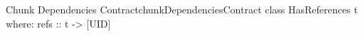 \begin{pseudohaskell}{Chunk Dependencies Contract}{chunkDependenciesContract}
class HasReferences t where:
      refs :: t -> [UID]
\end{pseudohaskell}
